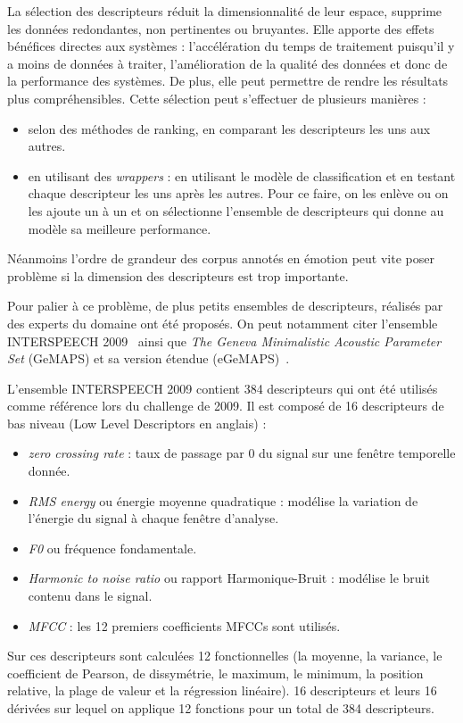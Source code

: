La sélection des descripteurs réduit la dimensionnalité de leur espace, supprime les données redondantes, non pertinentes ou bruyantes. Elle apporte des effets bénéfices directes aux systèmes : l'accélération du temps de traitement puisqu'il y a moins de données à traiter, l'amélioration de la qualité des données et donc de la performance des systèmes. De plus, elle peut permettre de rendre les résultats plus compréhensibles.
Cette sélection peut s'effectuer de plusieurs manières :
\begin{itemize}
    \item selon des méthodes de ranking, en comparant les descripteurs les uns aux autres.
    \item en utilisant des \textit{wrappers} : en utilisant le modèle de classification et en testant chaque descripteur les uns après les autres. Pour ce faire, on les enlève ou on les ajoute un à un et on sélectionne l'ensemble de descripteurs qui donne au modèle sa meilleure performance.
\end{itemize}
Néanmoins l'ordre de grandeur des corpus annotés en émotion peut vite poser problème si la dimension des descripteurs est trop importante.

Pour palier à ce problème, de plus petits ensembles de descripteurs, réalisés par des experts du domaine ont été proposés. On peut notamment citer l'ensemble INTERSPEECH 2009~\cite{Schuller2009} ainsi que \textit{The Geneva Minimalistic Acoustic Parameter Set} (GeMAPS) et sa version étendue (eGeMAPS)~\cite{Eyben2016}.

L'ensemble INTERSPEECH 2009 contient 384 descripteurs qui ont été utilisés comme référence lors du challenge de 2009. Il est composé de 16 descripteurs de bas niveau (Low Level Descriptors en anglais) :
\begin{itemize}
  \item \textit{zero crossing rate} : taux de passage par 0 du signal sur une fenêtre temporelle donnée.
  \item \textit{RMS energy} ou énergie moyenne quadratique : modélise la variation de l’énergie du signal à chaque fenêtre d'analyse.
  \item \textit{F0} ou fréquence fondamentale.
  \item \textit{Harmonic to noise ratio} ou rapport Harmonique-Bruit : modélise le bruit contenu dans le signal.
  \item \textit{MFCC} : les 12 premiers coefficients MFCCs sont utilisés.
\end{itemize}
Sur ces descripteurs sont calculées 12 fonctionnelles (la moyenne, la variance, le coefficient de Pearson, de dissymétrie, le maximum, le minimum, la position relative, la plage de valeur et la régression linéaire). 16 descripteurs et leurs 16 dérivées sur lequel on applique 12 fonctions pour un total de 384 descripteurs.

